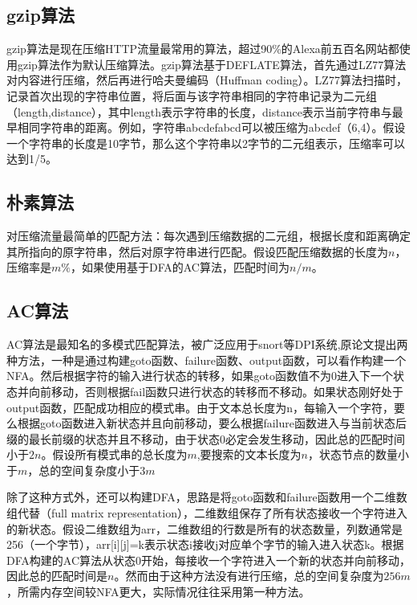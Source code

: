 \vspace{3mm}
\subsection{gzip算法}
gzip算法\cite{RFC1952}是现在压缩HTTP流量最常用的算法，超过90\%的Alexa前五百名网站都使用gzip算法作为默认压缩算法。gzip算法基于DEFLATE算法，首先通过LZ77算法对内容进行压缩，然后再进行哈夫曼编码（Huffman coding）。LZ77算法扫描时，记录首次出现的字符串位置，将后面与该字符串相同的字符串记录为二元组（length,distance），其中length表示字符串的长度，distance表示当前字符串与最早相同字符串的距离。例如，字符串abcdefabcd可以被压缩为abcdef（6,4）。假设一个字符串的长度是10字节，那么这个字符串以2字节的二元组表示，压缩率可以达到1/5。

\vspace{3mm}
\subsection{朴素算法}
对压缩流量最简单的匹配方法：每次遇到压缩数据的二元组，根据长度和距离确定其所指向的原字符串，然后对原字符串进行匹配。假设匹配压缩数据的长度为$n$，压缩率是$m\%$，如果使用基于DFA的AC算法，匹配时间为$n/m$。

\vspace{3mm}
\subsection{AC算法}
AC算法是最知名的多模式匹配算法，被广泛应用于snort等DPI系统,原论文\cite{aho1975efficient}提出两种方法，一种是通过构建goto函数、failure函数、output函数，可以看作构建一个NFA。然后根据字符的输入进行状态的转移，如果goto函数值不为0进入下一个状态并向前移动，否则根据fail函数只进行状态的转移而不移动。如果状态刚好处于output函数，匹配成功相应的模式串。由于文本总长度为n，每输入一个字符，要么根据goto函数进入新状态并且向前移动，要么根据failure函数进入与当前状态后缀的最长前缀的状态并且不移动，由于状态0必定会发生移动，因此总的匹配时间小于$2n$。假设所有模式串的总长度为$m$,要搜索的文本长度为$n$，状态节点的数量小于$m$，总的空间复杂度小于$3m$

除了这种方式外，还可以构建DFA，思路是将goto函数和failure函数用一个二维数组代替（full matrix representation），二维数组保存了所有状态接收一个字符进入的新状态。假设二维数组为arr，二维数组的行数是所有的状态数量，列数通常是256（一个字节），arr[i][j]=k表示状态i接收j对应单个字节的输入进入状态k。根据DFA构建的AC算法从状态0开始，每接收一个字符进入一个新的状态并向前移动，因此总的匹配时间是$n$。然而由于这种方法没有进行压缩，总的空间复杂度为$256m$，所需内存空间较NFA更大，实际情况往往采用第一种方法。

